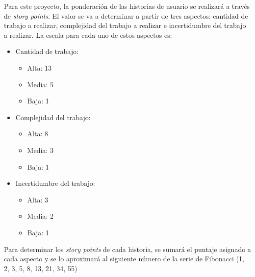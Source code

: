 \documentclass[
11pt, %
codirector, %
]{charter}
\begin{document}

Para este proyecto, la ponderación de las historias de usuario se realizará a través de \textit{story points}. El valor se va a determinar a partir de tres aspectos: cantidad de trabajo a realizar, complejidad del trabajo a realizar e incertidumbre del trabajo a realizar. La escala para cada uno de estos aspectos es:

\begin{itemize}
	\item Cantidad de trabajo:
	\begin{itemize}
		\item Alta: 13
		\item Media: 5
		\item Baja: 1
	\end{itemize}
	
	\item Complejidad del trabajo:
	\begin{itemize}
		\item Alta: 8
		\item Media: 3
		\item Baja: 1
	\end{itemize}
	
	\item Incertidumbre del trabajo:
	\begin{itemize}
		\item Alta: 3
		\item Media: 2
		\item Baja: 1
	\end{itemize}
\end{itemize}

Para determinar los \textit{story points} de cada historia, se sumará el puntaje asignado a cada aspecto y se lo aproximará al siguiente número de la serie de Fibonacci (1, 2, 3, 5, 8, 13, 21, 34, 55)
\end{document}
